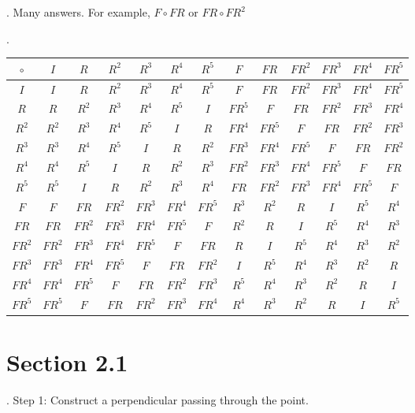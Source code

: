 .  Many answers.  For example, $F \circ FR$ or $FR \circ FR^2$

.  \vskip 0.1in

\begin{tabular}{|c||c|c|c|c|c|c|c|c|c|c|c|c|}
		\hline
		$\circ$ & $I$ & $R$ & $R^2$ & $R^3$ & $R^4$ & $R^5$ & $F$ & $FR$ & $FR^2$ & $FR^3$ & $FR^4$ & $FR^5$ \\ \hline \hline 
		$I$ & $I$ & $R$ & $R^2$ & $R^3$ & $R^4$ & $R^5$ & $F$ & $FR$ & $FR^2$ & $FR^3$ & $FR^4$ & $FR^5$ \\ \hline
		$R$ & $R$ & $R^2$ & $R^3$ & $R^4$ & $R^5$ & $I$ & $FR^5$ & $F$ & $FR$ & $FR^2$ & $FR^3$ & $FR^4$\\ \hline
		$R^2$ & $R^2$ & $R^3$ & $R^4$ & $R^5$ & $I$ & $R$ & $FR^4$ &  $FR^5$ & $F$ & $FR$ & $FR^2$ & $FR^3$ \\ \hline
		$R^3$ &  $R^3$ & $R^4$ & $R^5$ & $I$ & $R$ & $R^2$ & $FR^3$ & $FR^4$ &  $FR^5$ & $F$ & $FR$ & $FR^2$ \\ \hline
		$R^4$ &  $R^4$ & $R^5$ & $I$ & $R$ & $R^2$ & $R^3$ & $FR^2$ & $FR^3$ & $FR^4$ &  $FR^5$ & $F$ & $FR$ \\ \hline
		$R^5$ & $R^5$ & $I$ & $R$ & $R^2$ & $R^3$ & $R^4$ & $FR$ & $FR^2$ & $FR^3$ & $FR^4$ &  $FR^5$ & $F$  \\ \hline
		$F$ & $F$ & $FR$ & $FR^2$ & $FR^3$ & $FR^4$ & $FR^5$ & $R^3$ & $R^2$ & $R$ & $I$ & $R^5$ & $R^4$ \\ \hline
		$FR$ & $FR$ & $FR^2$ & $FR^3$ & $FR^4$ & $FR^5$ & $F$ & $R^2$ & $R$ & $I$ & $R^5$ & $R^4$ & $R^3$ \\ \hline
		$FR^2$ & $FR^2$ & $FR^3$ & $FR^4$ & $FR^5$ & $F$ & $FR$ & $R$ & $I$ & $R^5$ & $R^4$ & $R^3$ & $R^2$  \\ \hline
		$FR^3$ & $FR^3$ & $FR^4$ & $FR^5$ & $F$ & $FR$ & $FR^2$ & $I$ & $R^5$ & $R^4$ & $R^3$ & $R^2$ & $R$  \\ \hline
		$FR^4$ & $FR^4$ & $FR^5$ & $F$ & $FR$ & $FR^2$ & $FR^3$ & $R^5$ & $R^4$ & $R^3$ & $R^2$ & $R$ & $I$ \\ \hline
		$FR^5$ & $FR^5$ & $F$ & $FR$ & $FR^2$ & $FR^3$ & $FR^4$ &  $R^4$ & $R^3$ & $R^2$ & $R$ & $I$ & $R^5$\\ \hline
		\hline
	\end{tabular}


\section*{Section 2.1}


 .  Step 1: Construct a perpendicular passing through the point. 
 
